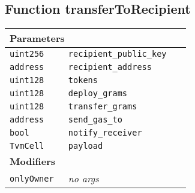 \subsection{Function transferToRecipient}


\ifsoltables
\noindent\begin{tabular}{|l|l|p{5cm}|}\hline
\multicolumn{3}{|l|}{\bf Parameters}\\\hline
\tt uint256 & \tt recipient\_{}public\_{}key &\\\hline
\tt address & \tt recipient\_{}address &\\\hline
\tt uint128 & \tt tokens &\\\hline
\tt uint128 & \tt deploy\_{}grams &\\\hline
\tt uint128 & \tt transfer\_{}grams &\\\hline
\tt address & \tt send\_{}gas\_{}to &\\\hline
\tt bool & \tt notify\_{}receiver &\\\hline
\tt TvmCell & \tt payload &\\\hline
\multicolumn{3}{|l|}{\bf Modifiers}\\\hline
\tt onlyOwner & {\em no args} &\\\hline
\end{tabular}
\fi

\vspace{2cm}

